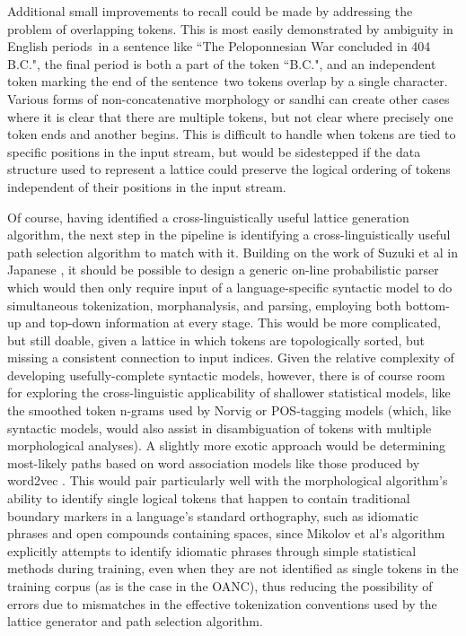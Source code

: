 Additional small improvements to recall could be made by addressing the problem of overlapping tokens. This is most easily demonstrated by ambiguity in English periods\textemdash~in a sentence like ``The Peloponnesian War concluded in 404 B.C.", the final period is both a part of the token ``B.C.", and an independent token marking the end of the sentence\textemdash~two tokens overlap by a single character. Various forms of non-concatenative morphology or sandhi can create other cases where it is clear that there are multiple tokens, but not clear where precisely one token ends and another begins. This is difficult to handle when tokens are tied to specific positions in the input stream, but would be sidestepped if the data structure used to represent a lattice could preserve the logical ordering of tokens independent of their positions in the input stream.

Of course, having identified a cross-linguistically useful lattice generation algorithm, the next step in the pipeline is identifying a cross-linguistically useful path selection algorithm to match with it. Building on the work of Suzuki et al in Japanese \cite{suzuki00}, it should be possible to design a generic on-line probabilistic parser which would then only require input of a language-specific syntactic model to do simultaneous tokenization, morphanalysis, and parsing, employing both bottom-up and top-down information at every stage. This would be more complicated, but still doable, given a lattice in which tokens are topologically sorted, but missing a consistent connection to input indices. Given the relative complexity of developing usefully-complete syntactic models, however, there is of course room for exploring the cross-linguistic applicability of shallower statistical models, like the smoothed token n-grams used by Norvig \cite{norvig14} or POS-tagging models (which, like syntactic models, would also assist in disambiguation of tokens with multiple morphological analyses). A slightly more exotic approach would be determining most-likely paths based on word association models like those produced by word2vec \cite{mikolov13}. This would pair particularly well with the morphological algorithm's ability to identify single logical tokens that happen to contain traditional boundary markers in a language's standard orthography, such as idiomatic phrases and open compounds containing spaces, since Mikolov et al's algorithm explicitly attempts to identify idiomatic phrases through simple statistical methods during training, even when they are not identified as single tokens in the training corpus (as is the case in the OANC), thus reducing the possibility of errors due to mismatches in the effective tokenization conventions used by the lattice generator and path selection algorithm.